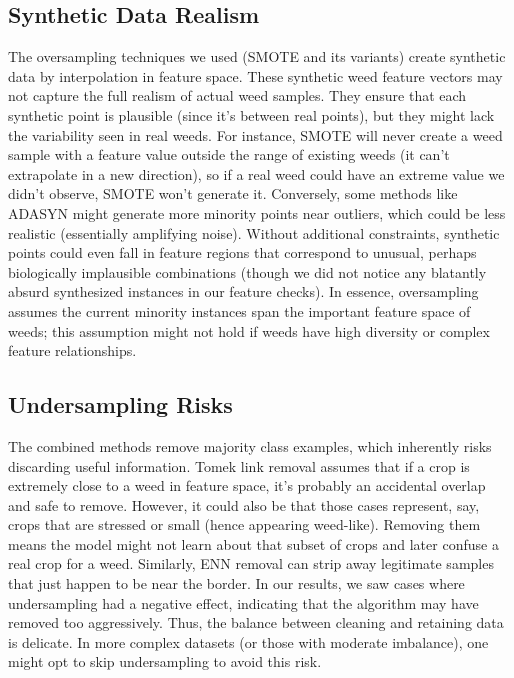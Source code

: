 \documentclass[agriengineering,article,submit,pdftex,moreauthors]{Definitions/mdpi}
\begin{document}
\subsection{Synthetic Data Realism}
The oversampling techniques we used (SMOTE and its variants) create synthetic data by interpolation in feature space. These synthetic weed feature vectors may not capture the full realism of actual weed samples. They ensure that each synthetic point is plausible (since it’s between real points), but they might lack the variability seen in real weeds. For instance, SMOTE will never create a weed sample with a feature value outside the range of existing weeds (it can’t extrapolate in a new direction), so if a real weed could have an extreme value we didn’t observe, SMOTE won’t generate it. Conversely, some methods like ADASYN might generate more minority points near outliers, which could be less realistic (essentially amplifying noise). Without additional constraints, synthetic points could even fall in feature regions that correspond to unusual, perhaps biologically implausible combinations (though we did not notice any blatantly absurd synthesized instances in our feature checks). In essence, oversampling assumes the current minority instances span the important feature space of weeds; this assumption might not hold if weeds have high diversity or complex feature relationships.

\subsection{Undersampling Risks}
The combined methods remove majority class examples, which inherently risks discarding useful information. Tomek link removal assumes that if a crop is extremely close to a weed in feature space, it’s probably an accidental overlap and safe to remove. However, it could also be that those cases represent, say, crops that are stressed or small (hence appearing weed-like). Removing them means the model might not learn about that subset of crops and later confuse a real crop for a weed. Similarly, ENN removal can strip away legitimate samples that just happen to be near the border. In our results, we saw cases where undersampling had a negative effect, indicating that the algorithm may have removed too aggressively. Thus, the balance between cleaning and retaining data is delicate. In more complex datasets (or those with moderate imbalance), one might opt to skip undersampling to avoid this risk.
\end{document}
